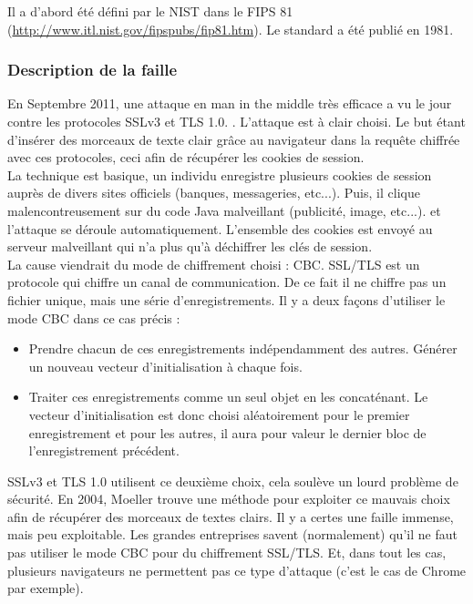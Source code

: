 Il a d'abord été défini par le NIST dans le FIPS 81 (\url{http://www.itl.nist.gov/fipspubs/fip81.htm}). Le standard a été publié en 1981.

\subsubsection{Description de la faille}

En Septembre 2011, une attaque en man in the middle très efficace a vu le jour contre les protocoles SSLv3 et TLS 1.0. \cite{ekr2011beast} \cite{imperial2011beast} \cite{goodin2011beast} \cite{gallagher2011beast}. L'attaque est à clair choisi. Le but étant d'insérer des morceaux de texte clair grâce au navigateur dans la requête chiffrée avec ces protocoles, ceci afin de récupérer les cookies de session.\\

La technique est basique, un individu enregistre plusieurs cookies de session auprès de divers sites officiels (banques, messageries, etc...). Puis, il clique malencontreusement sur du code Java malveillant (publicité, image, etc...). et l'attaque se déroule automatiquement. L'ensemble des cookies est envoyé au serveur malveillant qui n'a plus qu'à déchiffrer les clés de session.\\

La cause viendrait du mode de chiffrement choisi : CBC. SSL/TLS est un protocole qui chiffre un canal de communication. De ce fait il ne chiffre pas un fichier unique, mais une série d'enregistrements. Il y a deux façons d'utiliser le mode CBC dans ce cas précis :
\begin{itemize}
\item Prendre chacun de ces enregistrements indépendamment des autres. Générer un nouveau vecteur d'initialisation à chaque fois.
\item Traiter ces enregistrements comme un seul objet en les concaténant. Le vecteur d'initialisation est donc choisi aléatoirement pour le premier enregistrement et pour les autres, il aura pour valeur le dernier bloc de l'enregistrement précédent.\\

\end{itemize}

SSLv3 et TLS 1.0 utilisent ce deuxième choix, cela soulève un lourd problème de sécurité. En 2004, Moeller \cite{moeller2004cbc} trouve une méthode pour exploiter ce mauvais choix afin de récupérer des morceaux de textes clairs. Il y a certes une faille immense, mais peu exploitable. Les grandes entreprises savent (normalement) qu'il ne faut pas utiliser le mode CBC pour du chiffrement SSL/TLS. Et, dans tout les cas, plusieurs navigateurs ne permettent pas ce type d'attaque (c'est le cas de Chrome par exemple).

